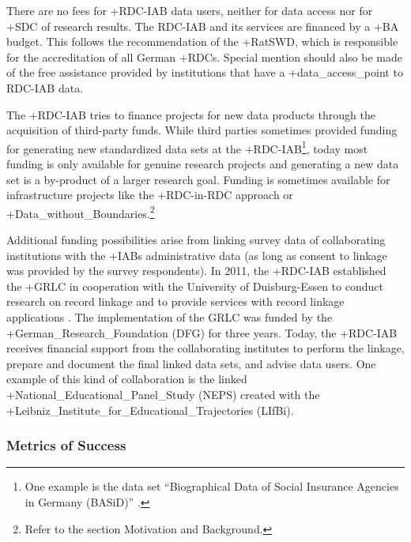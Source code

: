 \documentclass[
]{WileySix}
\begin{document}
There are no fees for +RDC-IAB\textbar{} data users, neither for data access nor for +SDC\textbar{} of research results. The RDC-IAB and its services are financed by a +BA\textbar{} budget. This follows the recommendation of the +RatSWD\textbar, which is responsible for the accreditation of all German +RDC\textbar s. Special mention should also be made of the free assistance provided by institutions that have a +data\_access\_point\textbar{} to RDC-IAB data.

The +RDC-IAB\textbar{} tries to finance projects for new data products through the acquisition of third-party funds. While third parties sometimes provided funding for generating new standardized data sets at the +RDC-IAB\textbar{}\footnote{One example is the data set ``Biographical Data of Social Insurance Agencies in Germany (BASiD)'' \citep{hochfellner2012}.}, today most funding is only available for genuine research projects and generating a new data set is a by-product of a larger research goal. Funding is sometimes available for infrastructure projects like the +RDC-in-RDC\textbar{} approach or +Data\_without\_Boundaries\textbar.\footnote{Refer to the section Motivation and Background.}

Additional funding possibilities arise from linking survey data of collaborating institutions with the +IAB\textbar s administrative data (as long as consent to linkage was provided by the survey respondents). In 2011, the +RDC-IAB\textbar{} established the +GRLC\textbar{} in cooperation with the University of Duisburg-Essen to conduct research on record linkage and to provide services with record linkage applications \citep{antoni2019}. The implementation of the GRLC was funded by the +German\_Research\_Foundation\textbar{} (DFG) for three years. Today, the +RDC-IAB\textbar{} receives financial support from the collaborating institutes to perform the linkage, prepare and document the final linked data sets, and advise data users. One example of this kind of collaboration is the linked +National\_Educational\_Panel\_Study\textbar{} (NEPS) created with the +Leibniz\_Institute\_for\_Educational\_Trajectories\textbar{} (LIfBi).

\hypertarget{metrics-of-success}{%
\subsubsection{Metrics of Success}\label{metrics-of-success}}
\end{document}
